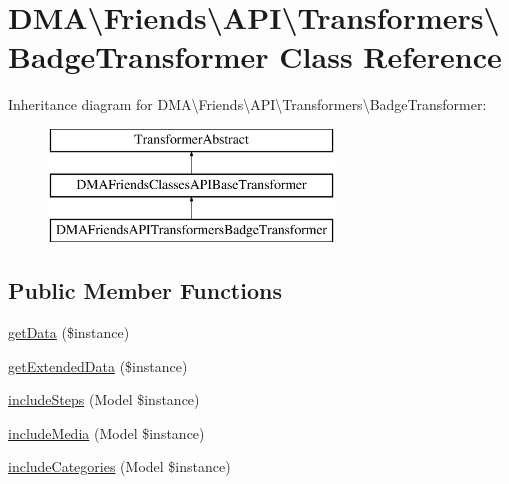 \hypertarget{classDMA_1_1Friends_1_1API_1_1Transformers_1_1BadgeTransformer}{}\section{D\+M\+A\textbackslash{}Friends\textbackslash{}A\+P\+I\textbackslash{}Transformers\textbackslash{}Badge\+Transformer Class Reference}
\label{classDMA_1_1Friends_1_1API_1_1Transformers_1_1BadgeTransformer}
Inheritance diagram for D\+M\+A\textbackslash{}Friends\textbackslash{}A\+P\+I\textbackslash{}Transformers\textbackslash{}Badge\+Transformer\+:\begin{figure}[H]
\begin{center}
\leavevmode
\includegraphics[height=3.000000cm]{d7/d79/classDMA_1_1Friends_1_1API_1_1Transformers_1_1BadgeTransformer}
\end{center}
\end{figure}
\subsection*{Public Member Functions}
\begin{DoxyCompactItemize}
\item 
\hyperlink{classDMA_1_1Friends_1_1API_1_1Transformers_1_1BadgeTransformer_a08baf63a97cf8ce2e377162bcf6c00a5}{get\+Data} (\$instance)
\item 
\hyperlink{classDMA_1_1Friends_1_1API_1_1Transformers_1_1BadgeTransformer_a8687692fddb3b0c6b47bb1a2f4ac45ce}{get\+Extended\+Data} (\$instance)
\item 
\hyperlink{classDMA_1_1Friends_1_1API_1_1Transformers_1_1BadgeTransformer_af14a3d805e9bdd81d5c9e5e334ab3617}{include\+Steps} (Model \$instance)
\item 
\hyperlink{classDMA_1_1Friends_1_1API_1_1Transformers_1_1BadgeTransformer_aa3b6235d12b9c07bf3e3126b493a9885}{include\+Media} (Model \$instance)
\item 
\hyperlink{classDMA_1_1Friends_1_1API_1_1Transformers_1_1BadgeTransformer_aa4d31e1a597aa42ef473882961c7c149}{include\+Categories} (Model \$instance)
\end{DoxyCompactItemize}

